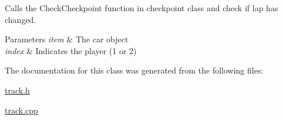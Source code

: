 Calls the Check\+Checkpoint function in checkpoint class and check if lap has changed. 


\begin{DoxyParams}{Parameters}
{\em item} & The car object \\
\hline
{\em index} & Indicates the player (1 or 2) \\
\hline
\end{DoxyParams}


The documentation for this class was generated from the following files\+:\begin{DoxyCompactItemize}
\item 
\mbox{\hyperlink{track_8h}{track.\+h}}\item 
\mbox{\hyperlink{track_8cpp}{track.\+cpp}}\end{DoxyCompactItemize}
